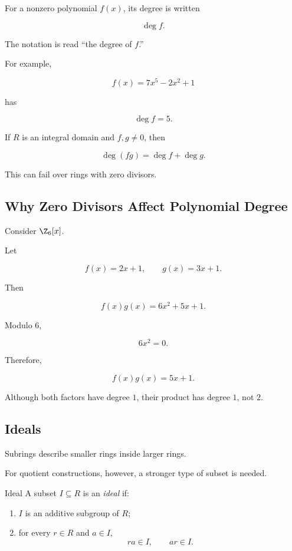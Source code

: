 For a nonzero polynomial \(f(x)\), its degree is written

\[ \deg f. \]

The notation is read ``the degree of \(f\).''

For example,

\[ f(x)=7x^5-2x^2+1 \]

has

\[ \deg f=5. \]

If \(R\) is an integral domain and \(f,g\neq0\), then

\[ \deg(fg)=\deg f+\deg g. \]

This can fail over rings with zero divisors.

\subsection{Why Zero Divisors Affect Polynomial Degree}
\label{subsec:zero-divisor-polynomial-degree}

Consider \(\Z_6[x]\).

Let

\[ f(x)=2x+1,\qquad g(x)=3x+1. \]

Then

\[ f(x)g(x)=6x^2+5x+1. \]

Modulo \(6\),

\[ 6x^2=0. \]

Therefore,

\[ f(x)g(x)=5x+1. \]

Although both factors have degree \(1\), their product has degree \(1\), not
\(2\).

\subsection{Ideals}
\label{subsec:ideals}

Subrings describe smaller rings inside larger rings.

For quotient constructions, however, a stronger type of subset is needed.

\begin{definitionbox}{Ideal}
A subset \(I\subseteq R\) is an \emph{ideal} if:

\begin{enumerate}
    \item \(I\) is an additive subgroup of \(R\);
    \item for every \(r\in R\) and \(a\in I\),
    \[ ra\in I,\qquad ar\in I. \]
\end{enumerate}
\end{definitionbox}

